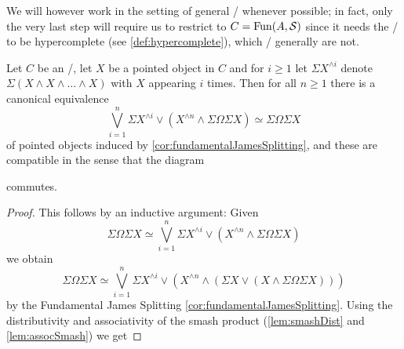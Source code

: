 We will however work in the setting of general \inftytops/ whenever possible; 
in fact, only the very last step will require us to restrict to $C=\operatorname{Fun}(A,\mathcal{S})$ since it needs the \inftytop/ to be hypercomplete (see \cref{def:hypercomplete}), which \inftytops/ generally are not.
\begin{corollary} 
    Let $C$ be an \inftytop/, let $X$ be a pointed object in $C$ and for $i\geq 1$ let $\Sigma X^{\wedge i}$ denote $\Sigma\left(X\wedge X\wedge\ldots\wedge X\right)$ with $X$ appearing $i$ times.
    Then for all $n\geq 1$ there is a canonical equivalence
    \begin{equation*}
        \bigvee\limits_{i=1}^n\Sigma X^{\wedge i}\vee\left(X^{\wedge n}\wedge\Sigma\Omega\Sigma X\right)\simeq\Sigma\Omega\Sigma X 
    \end{equation*}
    of pointed objects induced by \cref{cor:fundamentalJamesSplitting}, and these are compatible in the sense that the diagram
    \begin{center}
    \end{center}
    commutes.
    \begin{proof}
        This follows by an inductive argument:
        Given 
        \begin{equation*}
            \Sigma\Omega\Sigma X\simeq\bigvee\limits_{i=1}^n\Sigma X^{\wedge i}\vee\left(X^{\wedge n}\wedge\Sigma\Omega\Sigma X\right)
        \end{equation*}
        we obtain 
        \begin{equation*}
            \Sigma\Omega\Sigma X\simeq\bigvee\limits_{i=1}^n\Sigma X^{\wedge i}\vee\left(X^{\wedge n}\wedge\left(\Sigma X\vee\left(X\wedge\Sigma\Omega\Sigma X\right)\right)\right) 
        \end{equation*}
        by the Fundamental James Splitting \cref{cor:fundamentalJamesSplitting}.
        Using the distributivity and associativity of the smash product (\cref{lem:smashDist} and \cref{lem:assocSmash}) we get

\end{proof}
\end{corollary}
